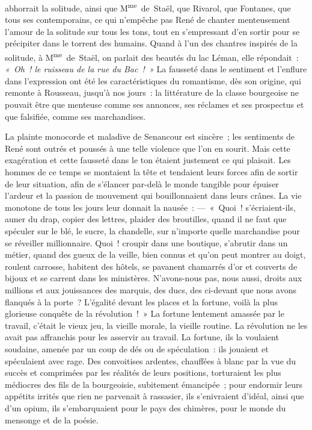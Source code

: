 \documentclass[french,twoside]{book} %
\begin{document}
\label{p595}abhorrait la solitude, ainsi que M\textsuperscript{me} de Staël, que Rivarol, que Fontanes, que tous ses contemporains, ce qui n’empêche pas René de chanter menteusement l’amour de la solitude sur tous les tons, tout en s’empressant d’en sortir pour se précipiter dans le torrent des humains. Quand à l’un des chantres inspirés de la solitude, à M\textsuperscript{me} de Staël, on parlait des beautés du lac Léman, elle répondait : \emph{« Oh ! le ruisseau de la rue du Bac ! »} La fausseté dans le sentiment et l’enflure dans l’expression ont été les caractéristiques du romantisme, dès son origine, qui remonte à Rousseau, jusqu’à nos jours : la littérature de la classe bourgeoise ne pouvait être que menteuse comme ses annonces, ses réclames et ses prospectus et que falsifiée, comme ses marchandises.\par
La plainte monocorde et maladive de Senancour est sincère ; les sentiments de René sont outrés et poussés à une telle violence que l’on en sourit. Mais cette exagération et cette fausseté dans le ton étaient justement ce qui plaisait. Les hommes de ce temps se montaient la tête et tendaient leurs forces afin de sortir de leur situation, afin de s’élancer par-delà le monde tangible pour épuiser l’ardeur et la passion de mouvement qui bouillonnaient dans leurs crânes. La vie monotone de tous les jours leur donnait la nausée : — « Quoi ! s’écriaient-ils, auner du drap, copier des lettres, plaider des broutilles, quand il ne faut que spéculer sur le blé, le sucre, la chandelle, sur n’importe quelle marchandise pour se réveiller millionnaire. Quoi ! croupir dans une boutique, s’abrutir dans un métier, quand des gueux de la veille, bien connus et qu’on peut montrer au doigt, roulent carrosse, habitent des hôtels, se pavanent chamarrés d’or et couverts de bijoux et se carrent dans les ministères. N’avons-nous pas, nous aussi, droits aux millions et aux jouissances des marquis, des ducs, des ci-devant que nous avons flanqués à la porte ? L’égalité devant les places et la fortune, voilà la plus glorieuse conquête de la révolution ! » La fortune lentement amassée par le travail, c’était le vieux jeu, la vieille morale, la vieille routine. La révolution ne les avait pas affranchis pour les asservir au travail. La fortune, ils la voulaient soudaine, amenée par un coup de dés ou de spéculation : ils jouaient et spéculaient avec rage. Des convoitises ardentes, chauffées à blanc par la vue du succès et comprimées par les réalités de leurs positions, torturaient les plus médiocres des fils de la bourgeoisie, subitement émancipée ; pour endormir leurs appétits irrités que rien ne parvenait à rassasier, ils s’enivraient d’idéal, ainsi que d’un opium, ils s’embarquaient pour le pays des chimères, pour le monde du mensonge et de la poésie.\par
\end{document}
